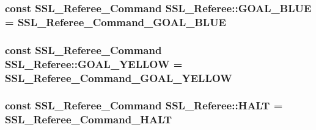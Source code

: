 \hypertarget{class_s_s_l___referee_ab94e834fdb7b4008573bc6fb0cbdc98a}{
\subsubsection[{G\-O\-A\-L\-\_\-\-B\-L\-U\-E}]{\setlength{\rightskip}{0pt plus 5cm}const {\bf S\-S\-L\-\_\-\-Referee\-\_\-\-Command} S\-S\-L\-\_\-\-Referee\-::\-G\-O\-A\-L\-\_\-\-B\-L\-U\-E = {\bf S\-S\-L\-\_\-\-Referee\-\_\-\-Command\-\_\-\-G\-O\-A\-L\-\_\-\-B\-L\-U\-E}\hspace{0.3cm}{\ttfamily [static]}}}\label{class_s_s_l___referee_ab94e834fdb7b4008573bc6fb0cbdc98a}
\hypertarget{class_s_s_l___referee_a92380665f0de0a170f5bc375c01b2d22}{
\subsubsection[{G\-O\-A\-L\-\_\-\-Y\-E\-L\-L\-O\-W}]{\setlength{\rightskip}{0pt plus 5cm}const {\bf S\-S\-L\-\_\-\-Referee\-\_\-\-Command} S\-S\-L\-\_\-\-Referee\-::\-G\-O\-A\-L\-\_\-\-Y\-E\-L\-L\-O\-W = {\bf S\-S\-L\-\_\-\-Referee\-\_\-\-Command\-\_\-\-G\-O\-A\-L\-\_\-\-Y\-E\-L\-L\-O\-W}\hspace{0.3cm}{\ttfamily [static]}}}\label{class_s_s_l___referee_a92380665f0de0a170f5bc375c01b2d22}
\hypertarget{class_s_s_l___referee_ab8715acde531d57fa49c895da6db99e4}{
\subsubsection[{H\-A\-L\-T}]{\setlength{\rightskip}{0pt plus 5cm}const {\bf S\-S\-L\-\_\-\-Referee\-\_\-\-Command} S\-S\-L\-\_\-\-Referee\-::\-H\-A\-L\-T = {\bf S\-S\-L\-\_\-\-Referee\-\_\-\-Command\-\_\-\-H\-A\-L\-T}\hspace{0.3cm}{\ttfamily [static]}}}\label{class_s_s_l___referee_ab8715acde531d57fa49c895da6db99e4}

